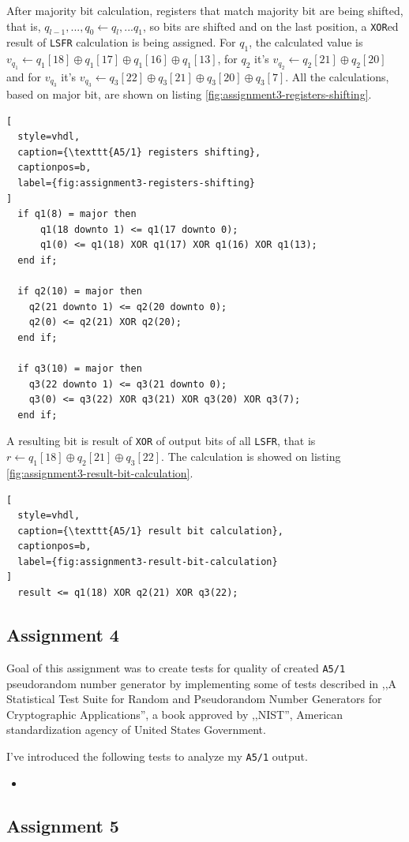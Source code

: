 After majority bit calculation, registers that match majority bit are being
shifted, that is, $q_{l-1}, ..., q_{0} \leftarrow q_{l}, ...q_{1}$,
so bits are shifted and on the last position, a \texttt{XOR}ed result of
\texttt{LSFR} calculation is being assigned. For $q_1$, the calculated
value is $ v_{q_1} \leftarrow q_1[18] \oplus q_1[17] \oplus q_1[16] \oplus q_1[13]$,
for $q_2$ it's $ v_{q_2} \leftarrow q_2[21] \oplus q_2[20]$ and for
$v_{q_3}$ it's $ v_{q_3} \leftarrow q_3[22] \oplus q_3[21] \oplus q_3[20] \oplus q_3[7]$.
All the calculations, based on major bit, are shown on listing \ref{fig:assignment3-registers-shifting}.
\begin{lstlisting}[
  style=vhdl,
  caption={\texttt{A5/1} registers shifting},
  captionpos=b,
  label={fig:assignment3-registers-shifting}
]
  if q1(8) = major then
      q1(18 downto 1) <= q1(17 downto 0);
      q1(0) <= q1(18) XOR q1(17) XOR q1(16) XOR q1(13);
  end if;

  if q2(10) = major then
    q2(21 downto 1) <= q2(20 downto 0);
    q2(0) <= q2(21) XOR q2(20);
  end if;

  if q3(10) = major then
    q3(22 downto 1) <= q3(21 downto 0);
    q3(0) <= q3(22) XOR q3(21) XOR q3(20) XOR q3(7);
  end if;
\end{lstlisting}

A resulting bit is result of \texttt{XOR} of output bits of all \texttt{LSFR},
that is $r \leftarrow q_1[18] \oplus q_2[21] \oplus q_3[22]$. The calculation
is showed on listing \ref{fig:assignment3-result-bit-calculation}.

\begin{lstlisting}[
  style=vhdl,
  caption={\texttt{A5/1} result bit calculation},
  captionpos=b,
  label={fig:assignment3-result-bit-calculation}
]
  result <= q1(18) XOR q2(21) XOR q3(22);
\end{lstlisting}

\subsection{Assignment 4}

Goal of this assignment was to create tests for quality of created \texttt{A5/1}
pseudorandom number generator by implementing some of tests described in
,,A Statistical Test Suite for Random and Pseudorandom Number Generators for
Cryptographic Applications'', a book approved by ,,NIST'', American standardization
agency of United States Government.

I've introduced the following tests to analyze my \texttt{A5/1} output.

\begin{itemize}
  \item
\end{itemize}

\subsection{Assignment 5}